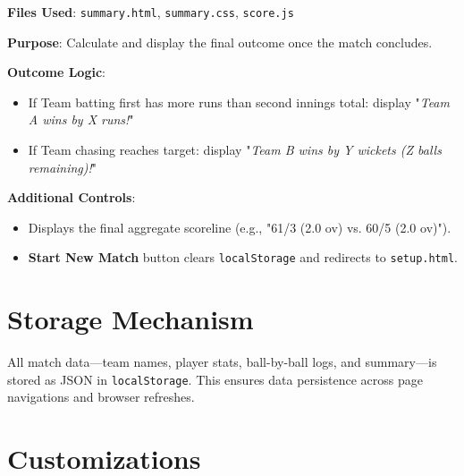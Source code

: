 \documentclass[a4paper,12pt]{article}
\begin{document}
\textbf{Files Used}: \texttt{summary.html}, \texttt{summary.css}, \texttt{score.js}

\textbf{Purpose}: Calculate and display the final outcome once the match concludes.

\textbf{Outcome Logic}:
\begin{itemize}
  \item If Team batting first has more runs than second innings total: display "\textit{Team A wins by X runs!}"
  \item If Team chasing reaches target: display "\textit{Team B wins by Y wickets (Z balls remaining)!}"
\end{itemize}

\textbf{Additional Controls}:
\begin{itemize}
  \item Displays the final aggregate scoreline (e.g., "61/3 (2.0 ov) vs. 60/5 (2.0 ov)").
  \item \textbf{Start New Match} button clears \texttt{localStorage} and redirects to \texttt{setup.html}.
\end{itemize}

\vspace{0.5cm}

\section*{Storage Mechanism}

All match data—team names, player stats, ball-by-ball logs, and summary—is stored as JSON in \texttt{localStorage}. This ensures data persistence across page navigations and browser refreshes.

\vspace{0.5cm}

\section*{Customizations}
\end{document}
